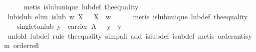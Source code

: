 \begin{isabellebody}
%
\isadelimproof
\ \ \ \ %
\endisadelimproof
%
\isatagproof
{}\isamarkupfalse%
\ {}metis\ is{}lub{}unique\ lub{}def\ the{}equality{}%
\endisatagproof
{\isafoldproof}%
%
\isadelimproof
\isanewline
%
\endisadelimproof
\isanewline
\ \ \isamarkupfalse%
\ lub{}is{}lub\ {}elim{}{}{}\ {}is{}lub\ w\ X\ {}\ {}\ X\ {}\ w{}\isanewline
%
\isadelimproof
\ \ \ \ %
\endisadelimproof
%
\isatagproof
{}\isamarkupfalse%
\ {}metis\ is{}lub{}unique\ lub{}def\ the{}equality{}%
\endisatagproof
{\isafoldproof}%
%
\isadelimproof
\isanewline
%
\endisadelimproof
\isanewline
\ \ \isamarkupfalse%
\ singleton{}lub{}\ {}y\ {}\ carrier\ A\ {}\ {}\ {}y{}\ {}\ y{}\isanewline
%
\isadelimproof
\ \ \ \ %
\endisadelimproof
%
\isatagproof
{}\isamarkupfalse%
\ {}unfold\ lub{}def{}\ rule\ the{}equality{}\ simp{}all\ add{}\ is{}lub{}def\ is{}ub{}def{}\ metis\ order{}antisym\ order{}refl{}%

\end{isabellebody}
